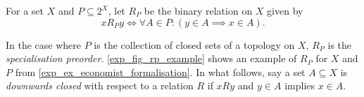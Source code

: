 
\begin{definition}
\label{exp_def_rp}

    For a set $X$ and $P \subseteq 2^X$, let $R_P$ be the binary relation on
    $X$ given by
    \[
        x{R_P}y \iff \forall A \in P: (y \in A \implies x \in A).
    \]
\end{definition}

In the case where $P$ is the collection of closed sets of a topology on $X$,
$R_P$ is the \emph{specialisation preorder}.
%
\cref{exp_fig_rp_example} shows an example of $R_P$ for $X$ and $P$ from
\cref{exp_ex_economist_formalisation}.
%
In what follows, say a set $A \subseteq X$ is \emph{downwards closed} with
respect to a relation $R$ if $xRy$ and $y \in A$ implies $x \in A$.


